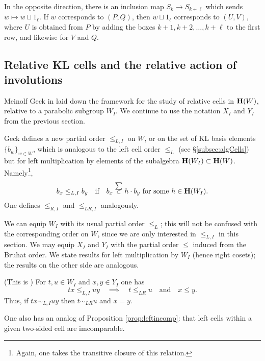 In the opposite direction, there is an inclusion map $S_k \to S_{k+\ell}$ which sends $w \mapsto w \sqcup 1_{\ell}$. If $w$ corresponds to $(P,Q)$, then $w \sqcup 1_{\ell}$ corresponds to $(U,V)$, where $U$ is obtained from $P$ by adding the boxes $k+1, k+2, \ldots, k+\ell$ to the first row, and likewise for $V$ and $Q$.


\subsection{Relative KL cells and the relative action of involutions}
\label{subsec:relativecells}

Meinolf Geck in \cite{GeckRelative} laid down the framework for the study of relative cells in ${\mathbf H}(W)$, relative to a parabolic subgroup $W_I$. We continue to use the notation $X_I$ and $Y_I$ from the previous section.

Geck defines a new partial order $\le_{L,I}$ on $W$, or on the set of KL basis elements $\{b_w\}_{w \in W}$, which is analogous to the left cell order $\le_L$ (see
\S\ref{subsec:algCells}) but for left multiplication by elements of the subalgebra ${\mathbf H}(W_I) \subset {\mathbf H}(W)$. Namely\footnote{Again, one takes the transitive closure of this relation.}, \[ b_x \le_{L,I} b_y \quad \textrm{if} \quad b_x \stackrel{\scriptscriptstyle \sum}{\scriptstyle{\subset}} h \cdot
b_y \textrm{ for some } h \in {\mathbf H}(W_I). \] One defines $\le_{R,I}$ and $\le_{LR,I}$ analogously.

We can equip $W_I$ with its usual partial order $\le_L$; this will not be confused with the corresponding order on $W$, since we are only interested in $\le_{L,I}$ in this section. We may equip $X_I$ and $Y_I$ with the partial order $\le$ induced from the Bruhat order. We state results for left multiplication by $W_I$ (hence right cosets); the results on the other side are analogous.

\begin{lemma} \label{lem:Geck1}(This is \cite[Proposition 4.4]{GeckRelative}) For $t,u \in W_I$ and $x,y \in Y_I$ one has
\begin{equation} \label{eq:Geck1} tx \le_{L,I} uy \quad \implies \quad t \le_{LR} u \quad \textrm{and} \quad x \le y. \end{equation}
Thus, if $tx \sim_{L,I} uy$ then $t \sim_{LR} u$ and $x = y$. \end{lemma}

One also has an analog of Proposition \ref{prop:leftincomp}: that left cells within a given two-sided cell are imcomparable.

